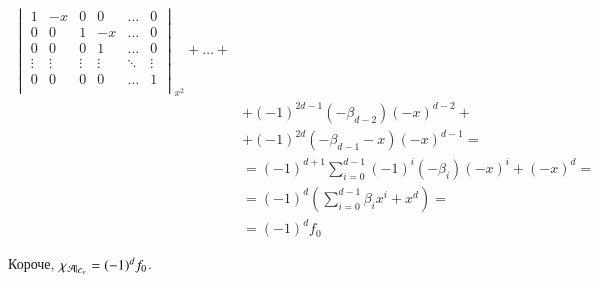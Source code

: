 \documentclass[main]{subfiles}
\begin{document}
\begin{align*}
{\begin{vmatrix}
                                                                     1      & -x     & 0      & 0      & \ldots & 0      \\
                                                                     0      & 0      & 1      & -x     & \ldots & 0      \\
                                                                     0      & 0      & 0      & 1      & \ldots & 0      \\
                                                                     \vdots & \vdots & \vdots & \vdots & \ddots & \vdots \\
                                                                     0      & 0      & 0      & 0      & \ldots & 1      \\
                                                                 \end{vmatrix}}_{x^2} + \ldots + \\
                        & + (-1)^{2d-1}(-\beta_{d-2})(-x)^{d-2} +                                                \\
                        & + (-1)^{2d}(-\beta_{d-1}-x)(-x)^{d-1} =                                                \\
                        & = (-1)^{d+1} \sum_{i=0}^{d-1} (-1)^i (-\beta_i)(-x)^i + (-x)^d =                       \\
                        & = (-1)^d\left(\sum_{i=0}^{d-1} \beta_i x^i + x^d\right) =                                     \\
                        & = (-1)^d f_0
\end{align*}

Короче, $\chi_{\mathcal{A} |_{C_v}} = (-1)^d f_0$.
\end{document}
